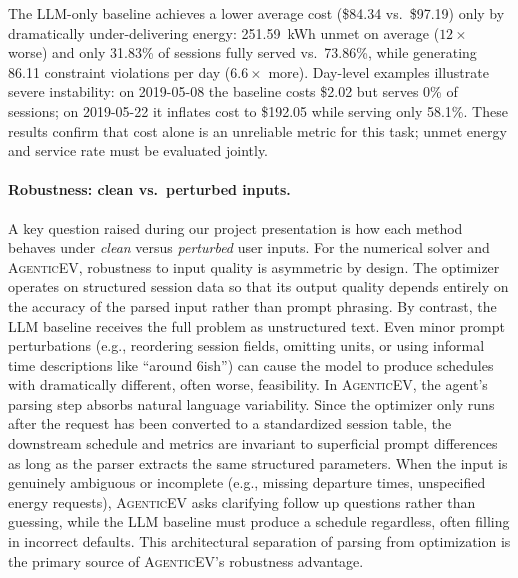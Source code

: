 \documentclass{article}
\newcommand{\modelname}{\textsc{AgenticEV}}
\begin{document}
The LLM-only baseline achieves a lower average cost (\$84.34 vs.\ \$97.19) only by dramatically under-delivering energy: 251.59~kWh unmet on average ($12\times$ worse) and only 31.83\% of sessions fully served vs.\ 73.86\%, while generating 86.11 constraint violations per day ($6.6\times$ more). Day-level examples illustrate severe instability: on 2019-05-08 the baseline costs \$2.02 but serves 0\% of sessions; on 2019-05-22 it inflates cost to \$192.05 while serving only 58.1\%. These results confirm that cost alone is an unreliable metric for this task; unmet energy and service rate must be evaluated jointly.

\paragraph{Robustness: clean vs.\ perturbed inputs.}
A key question raised during our project presentation is how each method behaves under \emph{clean} versus \emph{perturbed} user inputs. For the numerical solver and \modelname{}, robustness to input quality is asymmetric by design. The optimizer operates on structured session data so that its output quality depends entirely on the accuracy of the parsed input rather than prompt phrasing. By contrast, the LLM baseline receives the full problem as unstructured text. Even minor prompt perturbations (e.g., reordering session fields, omitting units, or using informal time descriptions like ``around 6ish'') can cause the model to produce schedules with dramatically different, often worse, feasibility. In \modelname{}, the agent's parsing step absorbs natural language variability. Since the optimizer only runs after the request has been converted to a standardized session table, the downstream schedule and metrics are invariant to superficial prompt differences as long as the parser extracts the same structured parameters. When the input is genuinely ambiguous or incomplete (e.g., missing departure times, unspecified energy requests), \modelname{} asks clarifying follow up questions rather than guessing, while the LLM baseline must produce a schedule regardless, often filling in incorrect defaults. This architectural separation of parsing from optimization is the primary source of \modelname{}'s robustness advantage.
\end{document}
